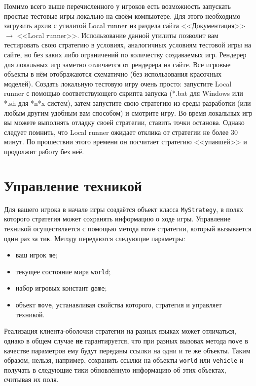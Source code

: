 Помимо всего выше перечисленного у игроков есть возможность запускать простые тестовые игры локально на своём компьютере. Для этого
необходимо загрузить архив с утилитой Local runner из раздела сайта <<Документация>> $\rightarrow$ <<Local runner>>. Использование данной
утилиты позволит вам тестировать свою стратегию в условиях, аналогичных условиям тестовой игры на сайте, но без каких либо ограничений по
количеству создаваемых игр. Рендерер для локальных игр заметно отличается от рендерера на сайте. Все игровые объекты в нём отображаются
схематично (без использования красочных моделей). Создать локальную тестовую игру очень просто: запустите Local runner с помощью
соответствующего скрипта запуска (*.bat для Windows или *.sh для *n*x систем), затем запустите свою стратегию из среды разработки (или любым
другим удобным вам способом) и смотрите игру. Во время локальных игр вы можете выполнять отладку своей стратегии, ставить точки останова.
Однако следует помнить, что Local runner ожидает отклика от стратегии не более $30$ минут. По прошествии этого времени он посчитает
стратегию <<упавшей>> и продолжит работу без неё.

\section{Управление техникой}

Для вашего игрока в начале игры создаётся объект класса \texttt{MyStrategy}, в полях которого стратегия может сохранять информацию о ходе
игры. Управление техникой осуществляется с помощью метода \texttt{move} стратегии, который вызывается один раз за тик. Методу передаются
следующие параметры:
\begin{itemize}
  \item ваш игрок \texttt{me};
  \item текущее состояние мира \texttt{world};
  \item набор игровых констант \texttt{game};
  \item объект \texttt{move}, устанавливая свойства которого, стратегия и управляет техникой.
\end{itemize}

Реализация клиента-оболочки стратегии на разных языках может отличаться, однако в общем случае \textbf{не} гарантируется, что при разных
вызовах метода \texttt{move} в качестве параметров ему будут переданы ссылки на одни и те же объекты. Таким образом, нельзя, например,
сохранить ссылки на объекты \texttt{world} или \texttt{vehicle} и получать в следующие тики обновлённую информацию об этих объектах, считывая
их поля.

